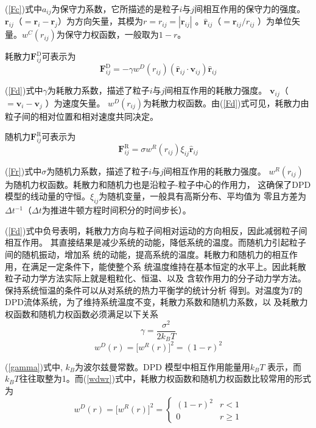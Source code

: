 \documentclass[twoside,12pt]{article}
\begin{document}
(\ref{Fc})式中$a_{ij}$为保守力系数，它所描述的是粒子$i$与$j$间相互作用的保守力的强度。 $\mathbf{r}_{ij}$（$=\mathbf{r}_i-\mathbf{r}_j$）为方向矢量，其模为$r = r_{ij} = |\mathbf{r}_{ij}|$ 。$\mathbf{\hat{r}}_{ij}$（$=\mathbf{r}_{ij}/r_{ij}$ ）为单位矢量。$w^C(r_{ij})$为保守力权函数，一般取为$1-r$。

耗散力$\mathbf{F}_{ij}^\mathrm{D}$可表示为
\begin{equation}\label{Fd}
\mathbf{F}_{ij}^\mathrm{D} = -\gamma w^D(r_{ij})(\hat{\mathbf{r}}_{ij}\cdot \mathbf{v}_{ij})\hat{\mathbf{r}}_{ij}
\end{equation}

(\ref{Fd})式中$\gamma$为耗散力系数，描述了粒子$i$与$j$间相互作用的耗散力强度。 $\mathbf{v}_{ij}$（$=\mathbf{v}_i-\mathbf{v}_j$ ）为速度矢量。 $w^D(r_{ij})$为耗散力权函数。由(\ref{Fd})式可见，耗散力由粒子间的相对位置和相对速度共同决定。


随机力$\mathbf{F}_{ij}^\mathrm{R}$可表示为
\begin{equation}\label{Fr}
\mathbf{F}_{ij}^\mathrm{R} = \sigma w^R(r_{ij})\xi_{ij}\hat{\mathbf{r}}_{ij}
\end{equation}

(\ref{Fr})式中$\sigma$为随机力系数，描述了粒子$i$与$j$间相互作用的耗散力强度。 $w^R(r_{ij})$为随机力权函数。耗散力和随机力也是沿粒子-粒子中心的作用力，
这确保了DPD模型的线动量的守恒。$\xi_{ij}$为随机变量，一般具有高斯分布、平均值为
零且方差为$\Delta t^{-1}$（$\Delta t$为推进牛顿方程时间积分的时间步长）。

(\ref{Fd})式中负号表明，耗散力方向与粒子间相对运动的方向相反，因此减弱粒子间相互作用。
其直接结果是减少系统的动能，降低系统的温度。而随机力引起粒子间的随机振动，增加系
统的动能，提高系统的温度。耗散力和随机力的相互作用，在满足一定条件下，能使整个系
统温度维持在基本恒定的水平上。因此耗散粒子动力学方法实际上就是粗粒化、恒温、以及
含软作用力的分子动力学方法。保持系统恒温的条件可以从对系统的热力平衡学的统计分析
得到\cite{Espanol}。对温度为$T$的DPD流体系统，为了维持系统温度不变，耗散力系数和随机力系数，以
及耗散力权函数和随机力权函数必须满足以下关系
\begin{equation}\label{gamma}
\gamma = \frac{\sigma^2}{2k_BT}
\end{equation}
\begin{equation}\label{wdwr}
w^D(r) = \Big[w^R(r)\Big]^2 = (1-r)^2
\end{equation}

(\ref{gamma})式中, $k_B$为波尔兹曼常数。DPD 模型中相互作用能量用$k_BT$ 表示，而$k_BT$往往取整为1。而(\ref{wdwr})式中，耗散力权函数和随机力权函数比较常用的形式为
\begin{equation}
w^D(r) = \Big[w^R(r)\Big]^2 = \left\{ \begin{array}{cc}
(1-r)^2 & r<1\\
0 & r \geq 1
\end{array} \right.
\end{equation}
\end{document}
